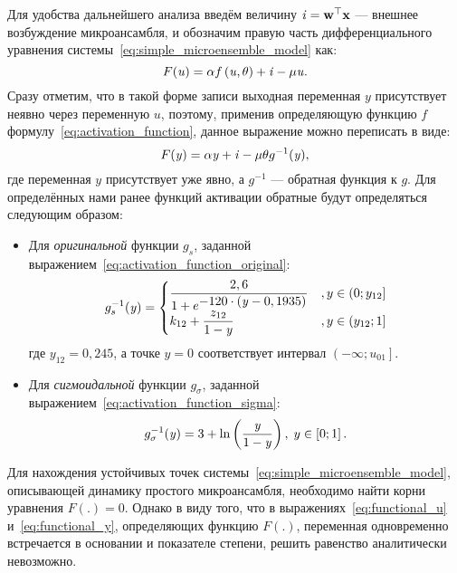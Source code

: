 Для удобства дальнейшего анализа введём величину $\mathit{i} = \mathrm{\mathbf{w}}^{\top} \mathrm{\mathbf{x}}$ --- внешнее возбуждение микроансамбля, и обозначим правую часть дифференциального уравнения системы~\eqref{eq:simple_microensemble_model} как:
\begin{equation}
    \label{eq:functional_u}
    F(\mathit{u}) = \alpha f\left( \mathit{u}, \theta \right) + \mathit{i} - \mu \mathit{u}.
\end{equation}
Сразу отметим, что в такой форме записи выходная переменная $y$ присутствует неявно через переменную $u$, поэтому, применив определяющую функцию $f$ формулу~\eqref{eq:activation_function}, данное выражение можно переписать в виде:
\begin{equation}
    \label{eq:functional_y}
    F(\mathit{y}) = \alpha \mathit{y} + \mathit{i} - \mu \theta g^{-1}(\mathit{y}),
\end{equation}
где переменная $y$ присутствует уже явно, а $g^{-1}$ --- обратная функция к $g$. Для определённых нами ранее функций активации обратные будут определяться следующим образом:
\begin{itemize}
    \item Для \textit{оригинальной} функции $g_{s}$, заданной выражением~\eqref{eq:activation_function_original}:
    \begin{equation}
        \label{eq:unactivation_function_original}
        g_{s}^{-1}(\mathit{y}) = 
        \begin{cases}
            \dfrac{2,6}{1 + e^{\displaystyle -120 \cdot (\mathit{y} - 0,1935)}} &, y \in \left(0; y_{12}\right] \\
            k_{12} + \dfrac{z_{12}}{1 - \mathit{y}}                             &, y \in \left(y_{12}; 1\right] \\
        \end{cases}
    \end{equation}
    где $y_{12} = 0,245$, а точке $y = 0$ соответствует интервал $\left(-\infty; u_{01}\right]$.
    \item Для \textit{сигмоидальной} функции $g_{\sigma}$, заданной выражением~\eqref{eq:activation_function_sigma}:
    \begin{equation}
        \label{eq:unactivation_function_sigma}
        g_{\sigma}^{-1}(\mathit{y}) = 3 + \ln\left(\dfrac{\mathit{y}}{1 - \mathit{y}}\right),\;y \in \left[0; 1\right].
    \end{equation}
\end{itemize}

Для нахождения устойчивых точек системы~\eqref{eq:simple_microensemble_model}, описывающей динамику простого микроансамбля, необходимо найти корни уравнения $F(.) = 0$. Однако в виду того, что в  выражениях~\eqref{eq:functional_u} и~\eqref{eq:functional_y}, определяющих функцию  $F(.)$, переменная одновременно встречается в основании и показателе степени, решить равенство аналитически невозможно. 

